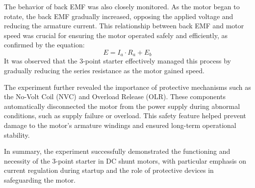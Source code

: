 \documentclass[a4paper,12pt]{article}
\begin{document}
The behavior of back EMF was also closely monitored. As the motor began to rotate, the back EMF gradually increased, opposing the applied voltage and reducing the armature current. This relationship between back EMF and motor speed was crucial for ensuring the motor operated safely and efficiently, as confirmed by the equation:
\[
E = I_a \cdot R_a + E_b
\]
It was observed that the 3-point starter effectively managed this process by gradually reducing the series resistance as the motor gained speed.

The experiment further revealed the importance of protective mechanisms such as the No-Volt Coil (NVC) and Overload Release (OLR). These components automatically disconnected the motor from the power supply during abnormal conditions, such as supply failure or overload. This safety feature helped prevent damage to the motor's armature windings and ensured long-term operational stability.


In summary, the experiment successfully demonstrated the functioning and necessity of the 3-point starter in DC shunt motors, with particular emphasis on current regulation during startup and the role of protective devices in safeguarding the motor.

	
\end{document}
